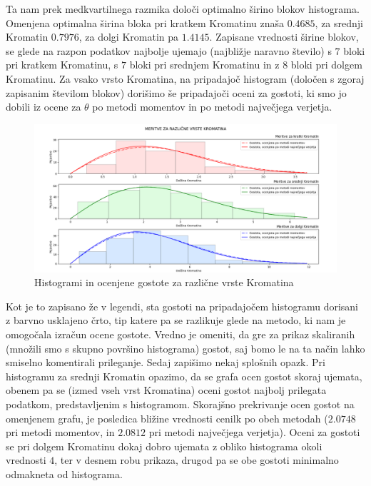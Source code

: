 \documentclass{article}
\begin{document}
Ta nam prek medkvartilnega razmika določi optimalno širino blokov histograma. Omenjena optimalna širina bloka pri kratkem Kromatinu znaša $0.4685$, za srednji Kromatin $0.7976$, za dolgi Kromatin pa $1.4145$.
Zapisane vrednosti širine blokov, se glede na razpon podatkov najbolje ujemajo (najbližje naravno število) s $7$ bloki pri kratkem Kromatinu, s $7$ bloki pri srednjem Kromatinu in z $8$ bloki pri dolgem Kromatinu. 
Za vsako vrsto Kromatina, na pripadajoč histogram (določen s zgoraj zapisanim številom blokov) dorišimo še pripadajoči oceni za gostoti, ki smo jo dobili iz ocene za $\theta$ po metodi momentov in po metodi največjega verjetja. 
\begin{figure}[H]
    \begin{center}
    \includegraphics[width=\linewidth]{naloga2f.png}
    \vspace*{-5mm}\caption{Histogrami in ocenjene gostote za različne vrste Kromatina}
    \end{center}    
\end{figure}
Kot je to zapisano že v legendi, sta gostoti na pripadajočem histogramu dorisani z barvno usklajeno črto, tip katere pa se razlikuje glede na metodo, ki nam je omogočala izračun ocene gostote.
Vredno je omeniti, da gre za prikaz skaliranih (množili smo s skupno površino histograma) gostot, saj bomo le na ta način lahko smiselno komentirali prileganje. 
\newline
Sedaj zapišimo nekaj splošnih opazk.
Pri histogramu za srednji Kromatin opazimo, da se grafa ocen gostot skoraj ujemata, obenem pa se (izmed vseh vrst Kromatina) oceni gostot najbolj prilegata podatkom, predstavljenim s histogramom. 
Skorajšno prekrivanje ocen gostot na omenjenem grafu, je posledica bližine vrednosti cenilk po obeh metodah ($2.0748$ pri metodi momentov,  in $2.0812$ pri metodi največjega verjetja).
Oceni za gostoti se pri dolgem Kromatinu dokaj dobro ujemata z obliko histograma okoli vrednosti $4$, ter v desnem robu prikaza, drugod pa se obe gostoti minimalno odmakneta od histograma. 
\end{document}
